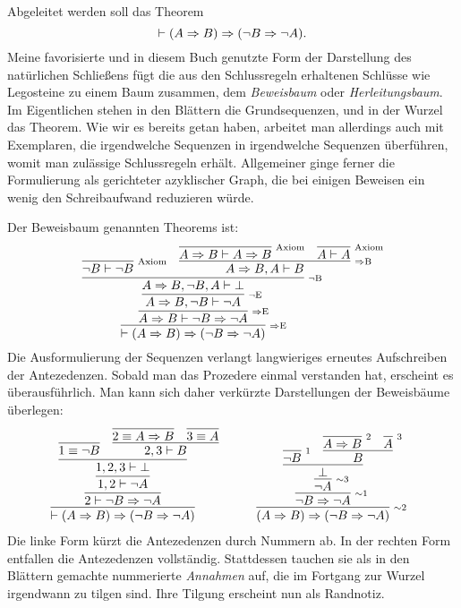 Abgeleitet werden soll das Theorem
\[\vdash (A\Rightarrow B)\Rightarrow (\lnot B\Rightarrow\lnot A).\]
Meine favorisierte und in diesem Buch genutzte Form der Darstellung
des natürlichen Schließens fügt die aus den Schlussregeln erhaltenen
Schlüsse wie Legosteine zu einem Baum zusammen, dem
\emph{Beweisbaum} oder \emph{Herleitungsbaum}.
Im Eigentlichen stehen in den Blättern die Grundsequenzen, und in der
Wurzel das Theorem. Wie wir es bereits getan haben, arbeitet man
allerdings auch mit Exemplaren, die irgendwelche Sequenzen in
irgendwelche Sequenzen überführen, womit man zulässige Schlussregeln
erhält. Allgemeiner ginge ferner die Formulierung als gerichteter
azyklischer Graph, die bei einigen Beweisen ein wenig den
Schreibaufwand reduzieren würde.

Der Beweisbaum genannten Theorems ist:
\[
\infer[\infernote{$\cond$E}]{\vdash (A\cond B)\cond (\lnot B\cond\lnot A)}{
  \infer[\infernote{$\cond$E}]{A\cond B\vdash \lnot B\cond\lnot A}{
    \infer[\infernote{$\lnot$E}]{A\cond B, \lnot B\vdash\lnot A}{
      \infer[\infernote{$\lnot$B}]{A\cond B, \lnot B, A\vdash\bot}{
        \infer[\infernote{Axiom}]{\lnot B\vdash\lnot B}{}
      & \infer[\infernote{$\cond$B}]{A\cond B, A\vdash B}{
          \infer[\infernote{Axiom}]{A\cond B\vdash A\cond B}{}
        & \infer[\infernote{Axiom}]{A\vdash A}{}}}}}}
\]
Die Ausformulierung der Sequenzen verlangt langwieriges erneutes
Aufschreiben der Antezedenzen. Sobald man das Prozedere einmal
verstanden hat, erscheint es überausführlich. Man kann sich daher
verkürzte Darstellungen der Beweisbäume überlegen:
\[
\begin{tabular}{@{}l@{\qquad\quad}l}
\infer{\vdash (A\cond B)\cond (\lnot B\cond\lnot A)}{
  \infer{2\vdash \lnot B\cond\lnot A}{
    \infer{1, 2\vdash\lnot A}{
      \infer{1, 2, 3\vdash\bot}{
        \infer{1\equiv\lnot B}{}
      & \infer{2, 3\vdash B}{
          \infer{2\equiv A\cond B}{}
        & \infer{3\equiv A}{}}}}}}
&
\infer[\infernote{$\sim$2}]{(A\cond B)\cond (\lnot B\cond\lnot A)}{
  \infer[\infernote{$\sim$1}]{\lnot B\cond\lnot A}{
    \infer[\infernote{$\sim$3}]{\lnot A}{
      \infer{\bot}{
        \infer[\infernote{1}]{\lnot B}{}
      & \infer{B}{
          \infer[\infernote{2}]{A\cond B}{}
        & \infer[\infernote{3}]{A}{}}}}}}
\end{tabular}
\]
Die linke Form kürzt die Antezedenzen durch Nummern ab. In der rechten
Form entfallen die Antezedenzen vollständig. Stattdessen tauchen sie
als in den Blättern gemachte nummerierte \emph{Annahmen} auf, die im
Fortgang zur Wurzel irgendwann zu tilgen sind. Ihre Tilgung erscheint
nun als Randnotiz.

